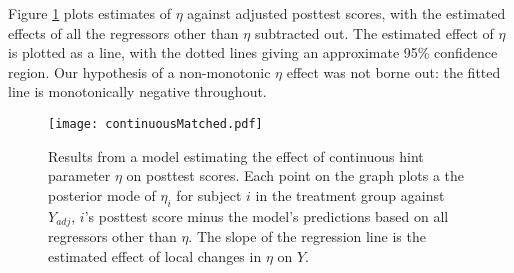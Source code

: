 Figure \ref{fig:gam} plots estimates of $\eta$ against adjusted
posttest scores, with the estimated effects of all the regressors
other than $\eta$ subtracted out.
The estimated effect of $\eta$ is plotted as a line, with the dotted
lines giving an approximate 95\% confidence region.
Our hypothesis of a non-monotonic $\eta$ effect was not borne out:
the fitted line is monotonically negative throughout.

\begin{figure}
\centering
\texttt{[image: continuousMatched.pdf]}
\caption{Results from a model estimating the effect of continuous hint
  parameter $\eta$ on posttest scores. Each point on the graph plots a
  the posterior mode of $\eta_i$ for subject $i$ in the treatment
  group against $Y_{adj}$, $i$'s posttest score minus the model's
  predictions based on all regressors other than $\eta$. The slope of the
  regression line is the estimated effect of local changes in $\eta$
  on $Y$.}
\label{fig:gam}
\end{figure}
